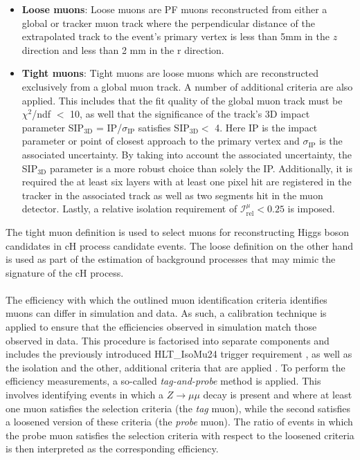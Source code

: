 \begin{itemize}
    \item \textbf{Loose muons}: Loose muons are PF muons reconstructed from either a global or tracker muon track where the perpendicular distance of the extrapolated track to the event's primary vertex is less than 5mm in the $z$ direction and less than 2 mm in the r direction. 
    \item \textbf{Tight muons}: Tight muons are loose muons which are reconstructed exclusively from a global muon track. A number of additional criteria are also applied. This includes that the fit quality of the global muon track must be $\chi^2$/ndf $<$ 10, as well that the significance of the track's 3D impact parameter SIP$_\mathrm{3D}$ = IP/$\sigma_\mathrm{IP}$ satisfies SIP$_\mathrm{3D}<$ 4. Here IP is the impact parameter or point of closest approach to the primary vertex and $\sigma_\mathrm{IP}$ is the associated uncertainty. By taking into account the associated uncertainty, the SIP$_\mathrm{3D}$ parameter is a more robust choice than solely the IP. Additionally, it is required the at least six layers with at least one pixel hit are registered in the tracker in the associated track as well as two segments hit in the muon detector. Lastly, a relative isolation requirement of $\mathcal{I}^{\mu}_{\mathrm{rel}} < 0.25$ is imposed. 
\end{itemize}
The tight muon definition is used to select muons for reconstructing Higgs boson candidates in cH process candidate events. The loose definition on the other hand is used as part of the estimation of background processes that may mimic the signature of the cH process.  \\
\\
The efficiency with which the outlined muon identification criteria identifies muons can differ in simulation and data. As such, a calibration technique is applied to ensure that the efficiencies observed in simulation match those observed in data. This procedure is factorised into separate components and includes the previously introduced HLT\_IsoMu24 trigger requirement \cite{MuonTrigger}, as well as the isolation and the other, additional criteria that are applied \cite{MuonID}. To perform the efficiency measurements, a so-called \textit{tag-and-probe} method is applied. This involves identifying events in which a $Z\rightarrow\mu\mu$ decay is present and where at least one muon satisfies the selection criteria (the \textit{tag} muon), while the second satisfies a loosened version of these criteria (the \textit{probe} muon). The ratio of events in which the probe muon satisfies the selection criteria with respect to the loosened criteria is then interpreted as the corresponding efficiency.  


